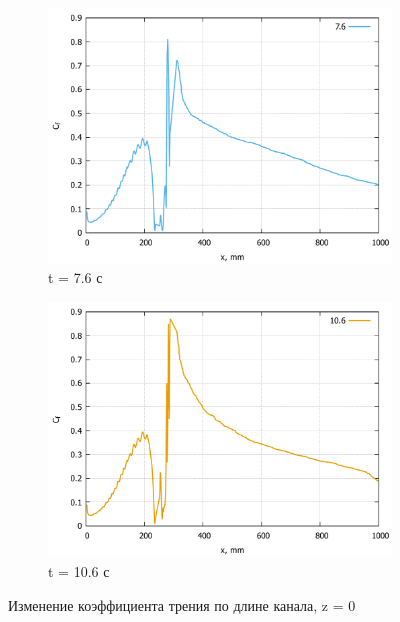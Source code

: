 \begin{figure}[H]
\begin{subfigure}{.5\textwidth}
			\includegraphics[width=1\linewidth]{../Assets/Cf-T760}
			\caption{t = 7.6 с}
			\label{fig:Cf-T760}
		\end{subfigure}%
		\begin{subfigure}{.5\textwidth}
			\centering
			\includegraphics[width=1\linewidth]{../Assets/Cf-T1060}
			\caption{t = 10.6 с}
			\label{fig:Cf-T1060}
		\end{subfigure}
		\caption{Изменение коэффициента трения по длине канала, z = 0}
		\label{fig:cf}
	\end{figure}

